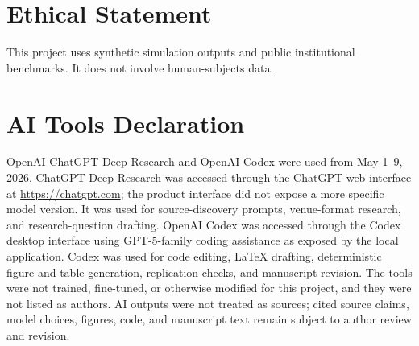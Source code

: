 \documentclass[
  journal=small,
  manuscript=research-article,
  year=2026
]{cup-journal}
\begin{document}
\section*{Ethical Statement}
This project uses synthetic simulation outputs and public institutional benchmarks. It does not involve human-subjects data.

\section*{AI Tools Declaration}
OpenAI ChatGPT Deep Research and OpenAI Codex were used from May 1--9, 2026. ChatGPT Deep Research was accessed through the ChatGPT web interface at \url{https://chatgpt.com}; the product interface did not expose a more specific model version. It was used for source-discovery prompts, venue-format research, and research-question drafting. OpenAI Codex was accessed through the Codex desktop interface using GPT-5-family coding assistance as exposed by the local application. Codex was used for code editing, LaTeX drafting, deterministic figure and table generation, replication checks, and manuscript revision. The tools were not trained, fine-tuned, or otherwise modified for this project, and they were not listed as authors. AI outputs were not treated as sources; cited source claims, model choices, figures, code, and manuscript text remain subject to author review and revision.

\begin{thebibliography}{}

\end{thebibliography}
\end{document}
